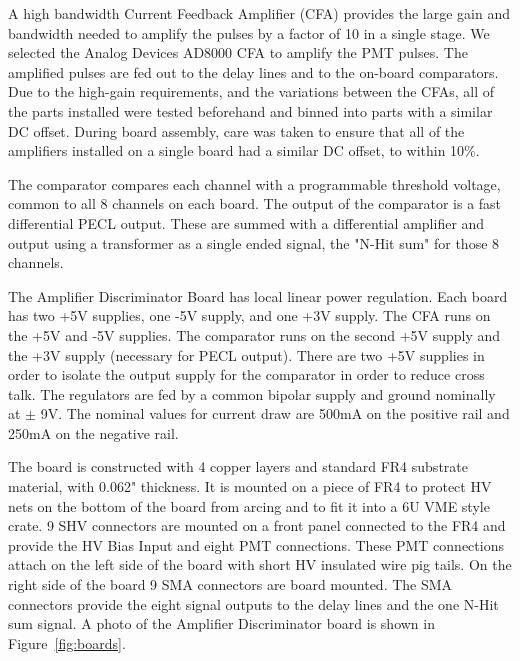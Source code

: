 \documentclass{JINST}
\begin{document}
A high bandwidth Current Feedback Amplifier (CFA) provides the large
gain and bandwidth needed to amplify the pulses by a factor of 10 in a
single stage.  We selected the Analog Devices AD8000 CFA to amplify
the PMT pulses.  The amplified pulses are fed out to the delay
lines and to the on-board comparators.  Due to the high-gain
requirements, and the variations between the CFAs, all of the parts
installed were tested beforehand and binned into parts with a similar
DC offset.  During board assembly, care was taken to ensure that all
of the amplifiers installed on a single board had a similar DC offset,
to within 10\%.

The comparator compares each channel with a programmable threshold
voltage, common to all 8 channels on each board.  The output of the
comparator is a fast differential PECL output.  These are summed with
a differential amplifier and output using a transformer as a single
ended signal, the "N-Hit sum" for those 8 channels.

The Amplifier Discriminator Board has local linear power regulation.
Each board has two +5V supplies, one -5V supply, and one +3V supply.
The CFA runs on the +5V and -5V supplies.  The comparator runs on the
second +5V supply and the +3V supply (necessary for PECL output).
There are two +5V supplies in order to isolate the output supply for
the comparator in order to reduce cross talk.  The regulators are fed
by a common bipolar supply and ground nominally at $\pm$ 9V.  The
nominal values for current draw are 500mA on the positive rail and
250mA on the negative rail.

The board is constructed with 4 copper layers and standard FR4
substrate material, with 0.062" thickness.  It is mounted on a piece
of FR4 to protect HV nets on the bottom of the board from arcing and
to fit it into a 6U VME style crate.  9 SHV connectors are mounted on
a front panel connected to the FR4 and provide the HV Bias Input and
eight PMT connections.  These PMT connections attach on the left side
of the board with short HV insulated wire pig tails.  On the right
side of the board 9 SMA connectors are board mounted.  The SMA
connectors provide the eight signal outputs to the delay lines and the
one N-Hit sum signal.  A photo of the Amplifier Discriminator
board is shown in Figure~\ref{fig:boards}.
\end{document}
